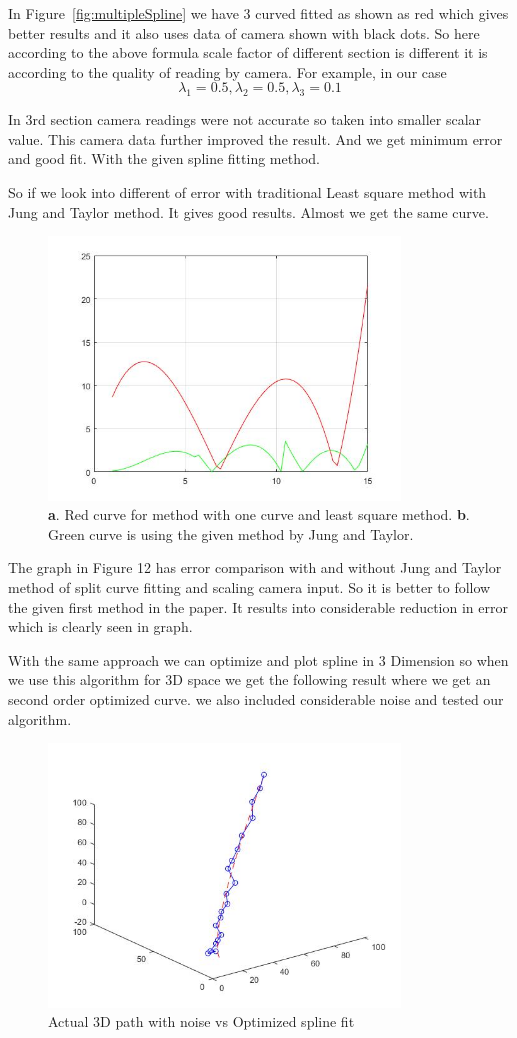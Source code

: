 In Figure~\ref{fig:multipleSpline} we have 3 curved fitted as shown as red which gives better results and it also uses data of camera shown with black dots. So here according to the above formula scale factor of different section is different it is according to the quality of reading by camera.
For example, in our case 
\begin{equation}
\lambda_1=0.5 ,\lambda_2=0.5 ,\lambda_3=0.1
\end{equation}

In 3rd section camera readings were not accurate so taken into smaller scalar value. This camera data further improved the result. And we get minimum error and good fit. With the given spline fitting method.

So if we look into different of error with traditional Least square method with Jung and Taylor method. It gives good results. Almost we get the same curve.

\begin{figure}[!htb]
\includegraphics[width=\textwidth,height=7cm,keepaspectratio]{./figures/ErrorC.jpg}
\caption{\textbf{a}. Red curve for method with one curve and least square method. 
\textbf{b}. Green curve is using the given method by Jung and Taylor.}
\label{fig:errorc1}
\end{figure}

The graph in Figure 12 has error comparison with and without Jung and Taylor method of split curve fitting and scaling camera input.
So it is better to follow the given first method in the paper. It results into considerable reduction in error which is clearly seen in graph.

With the same approach we can optimize and plot spline in 3 Dimension so when we use this algorithm for 3D space we get the following result where we get an second order optimized curve. we also included considerable noise and tested our algorithm.
  
\begin{figure}[H]
\includegraphics[width=\textwidth,height=7cm,keepaspectratio]{./figures/3DCurve.jpg}
\caption{Actual 3D path with noise vs Optimized spline fit}
\label{fig:errorc1}
\end{figure}